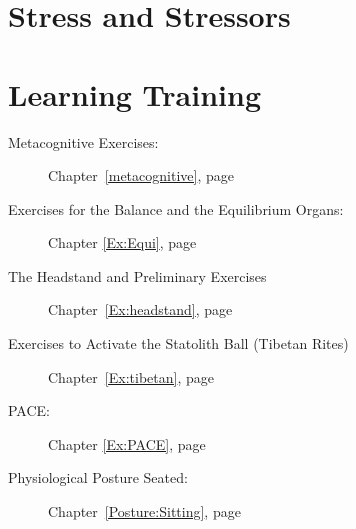 \documentclass[../main.tex]{subfiles}
\begin{document}
%
\section{Stress and Stressors}

\section{Learning Training}
\begin{description}
\item[Metacognitive Exercises:] Chapter~\ref{metacognitive}, page~\pageref{metacognitive}
\item[Exercises for the Balance and the Equilibrium Organs:] Chapter \ref{Ex:Equi}, page~\pageref{Ex:Equi}
\item[The Headstand and Preliminary Exercises] Chapter~\ref{Ex:headstand}, page~\pageref{Ex:headstand}
\item[Exercises to Activate the Statolith Ball (Tibetan Rites)] Chapter~\ref{Ex:tibetan}, page~\pageref{Ex:tibetan}
\item[PACE:] Chapter \ref{Ex:PACE}, page \pageref{Ex:PACE}
  \item[Physiological Posture Seated:] Chapter~\ref{Posture:Sitting}, page~\pageref{Posture:Sitting}
\end{description}
\end{document}
